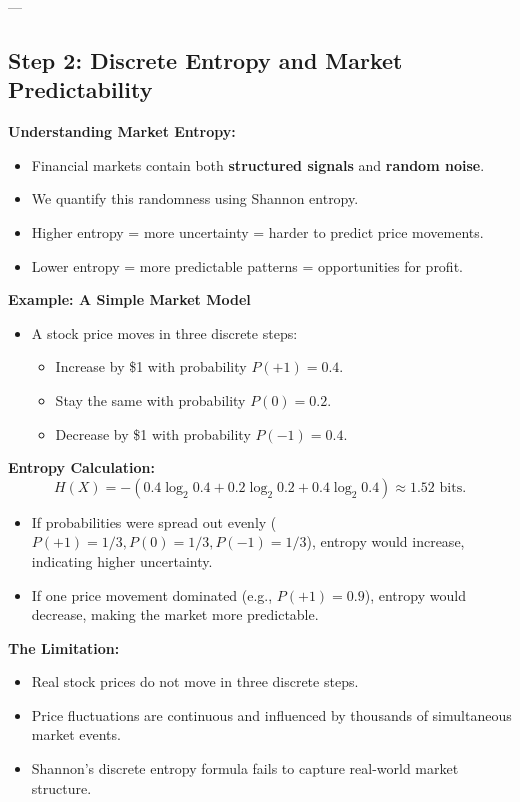 ---

\subsection{Step 2: Discrete Entropy and Market Predictability}

\textbf{Understanding Market Entropy:}
\begin{itemize}
    \item Financial markets contain both \textbf{structured signals} and \textbf{random noise}.
    \item We quantify this randomness using Shannon entropy.
    \item Higher entropy = more uncertainty = harder to predict price movements.
    \item Lower entropy = more predictable patterns = opportunities for profit.
\end{itemize}

\textbf{Example: A Simple Market Model}
\begin{itemize}
    \item A stock price moves in three discrete steps:
    \begin{itemize}
        \item Increase by \$1 with probability \( P(+1) = 0.4 \).
        \item Stay the same with probability \( P(0) = 0.2 \).
        \item Decrease by \$1 with probability \( P(-1) = 0.4 \).
    \end{itemize}
\end{itemize}

\textbf{Entropy Calculation:}
\[
H(X) = - (0.4 \log_2 0.4 + 0.2 \log_2 0.2 + 0.4 \log_2 0.4) \approx 1.52 \text{ bits}.
\]
\begin{itemize}
    \item If probabilities were spread out evenly (\( P(+1) = 1/3, P(0) = 1/3, P(-1) = 1/3 \)), entropy would increase, indicating higher uncertainty.
    \item If one price movement dominated (e.g., \( P(+1) = 0.9 \)), entropy would decrease, making the market more predictable.
\end{itemize}

\textbf{The Limitation:}
\begin{itemize}
    \item Real stock prices do not move in three discrete steps.
    \item Price fluctuations are continuous and influenced by thousands of simultaneous market events.
    \item Shannon’s discrete entropy formula fails to capture real-world market structure.
\end{itemize}

